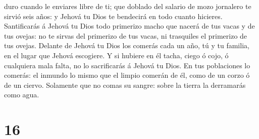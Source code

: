 duro cuando le enviares libre de ti; que doblado del salario de mozo
jornalero te sirvió seis años: y Jehová tu Dios te bendecirá en todo
cuanto hicieres.  Santificarás á Jehová tu Dios todo
primerizo macho que nacerá de tus vacas y de tus ovejas: no te sirvas
del primerizo de tus vacas, ni trasquiles el primerizo de tus ovejas.
 Delante de Jehová tu Dios los comerás cada un año, tú y
tu familia, en el lugar que Jehová escogiere.  Y si
hubiere en él tacha, ciego ó cojo, ó cualquiera mala falta, no lo
sacrificarás á Jehová tu Dios.  En tus poblaciones lo
comerás: el inmundo lo mismo que el limpio comerán de él, como de un
corzo ó de un ciervo.  Solamente que no comas su sangre:
sobre la tierra la derramarás como agua.

\hypertarget{section-15}{%
\section{16}\label{section-15}}

